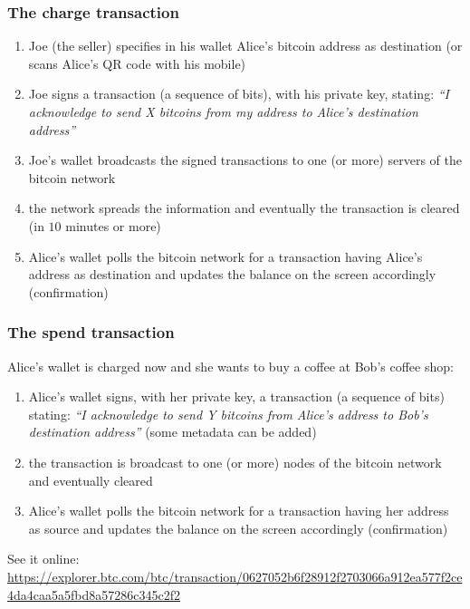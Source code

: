 \documentclass[11pt]{beamer}  %
\begin{document}
\begin{frame}\frametitle{The charge transaction}

  \begin{enumerate}
  \item Joe (the seller) specifies in his wallet Alice's bitcoin address
    as destination (or scans Alice's QR code with his mobile)
  \item Joe signs a transaction (a sequence of bits),
    with his private key, stating: \emph{``I acknowledge
    to send X bitcoins from my address to Alice's destination address''}
  \item Joe's wallet broadcasts the signed transactions
    to one (or more) servers of the bitcoin network
  \item the network spreads the information and eventually the transaction is cleared
    (in $10$ minutes or more)
  \item Alice's wallet polls the bitcoin network for a transaction having
    Alice's address as destination and updates the balance on the screen
    accordingly (\alert{confirmation})
  \end{enumerate}

\end{frame}

\begin{frame}\frametitle{The spend transaction}

  Alice's wallet is charged now and she wants to buy a coffee at Bob's coffee shop:

  \begin{enumerate}
  \item Alice's wallet signs, with her private key, a transaction
    (a sequence of bits) stating: \emph{``I acknowledge to send Y bitcoins from Alice's address
    to Bob's destination address''} (some metadata can be added)
  \item the transaction is broadcast to one (or more) nodes of the
    bitcoin network and eventually cleared
  \item Alice's wallet polls the bitcoin network for a transaction having
    her address as source and updates the balance on the screen
    accordingly (\alert{confirmation})
  \end{enumerate}

  \medskip
  See it online:
  {\scriptsize\url{https://explorer.btc.com/btc/transaction/0627052b6f28912f2703066a912ea577f2ce4da4caa5a5fbd8a57286c345c2f2}}

\end{frame}
\end{document}
